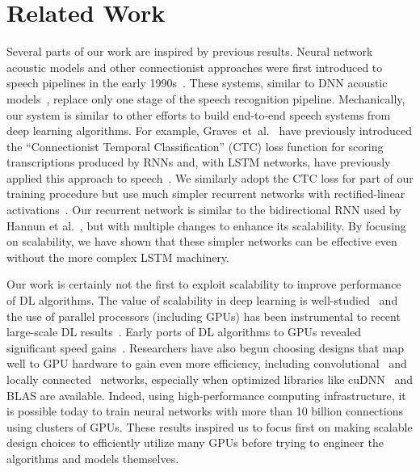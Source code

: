 \section{Related Work}
\label{sec:deepspeech:related}

Several parts of our work are inspired by previous results. Neural network
acoustic models and other connectionist approaches were first introduced to
speech pipelines in the early 1990s~\cite{bourlard93, renals1994, ellis1999}.
These systems, similar to DNN acoustic models~\cite{mohamed2011, hinton2012,
dahl2011a}, replace only one stage of the speech recognition pipeline.
Mechanically, our system is similar to other efforts to build end-to-end speech
systems from deep learning algorithms. For example,
Graves~et~al.~\cite{graves2006} have previously introduced the ``Connectionist
Temporal Classification'' (CTC) loss function for scoring transcriptions
produced by RNNs and, with LSTM networks, have previously applied this approach
to speech~\cite{graves2014}. We similarly adopt the CTC loss for part of our
training procedure but use much simpler recurrent networks with
rectified-linear activations~\cite{glorot2011, maas2013, nair2010}. Our
recurrent network is similar to the bidirectional RNN used by Hannun et
al.~\cite{hannun2014firstpass}, but with multiple changes to enhance its
scalability. By focusing on scalability, we have shown that these simpler
networks can be effective even without the more complex LSTM machinery.

Our work is certainly not the first to exploit scalability to improve
performance of DL algorithms. The value of scalability in deep learning is
well-studied~\cite{coates2011b, le2013} and the use of parallel processors
(including GPUs) has been instrumental to recent large-scale DL
results~\cite{szegedy2015, le2013}. Early ports of DL algorithms to GPUs
revealed significant speed gains~\cite{raina2009}. Researchers have also begun
choosing designs that map well to GPU hardware to gain even more efficiency,
including convolutional~\cite{krizhevsky2012imagenet, ciresan2011,
sainath2013deep} and locally connected~\cite{coates2013cotshpc, ciresan2012}
networks, especially when optimized libraries like
cuDNN~\cite{chetlur2014cudnn} and BLAS are available. Indeed, using
high-performance computing infrastructure, it is possible today to train neural
networks with more than 10 billion connections~\cite{coates2013cotshpc} using
clusters of GPUs. These results inspired us to focus first on making scalable
design choices to efficiently utilize many GPUs before trying to engineer the
algorithms and models themselves.

